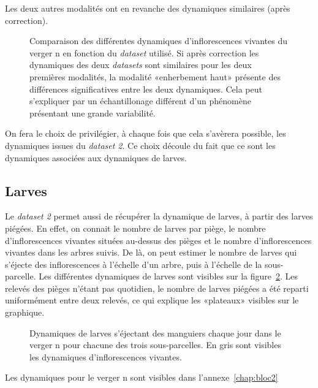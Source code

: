 Les deux autres modalités ont en revanche des dynamiques similaires (après correction).
\begin{figure}[ht]
\centering
{}
\caption{Comparaison des différentes dynamiques d'inflorescences vivantes du verger n en fonction du \emph{dataset} utilisé. Si après correction les dynamiques des deux \emph{datasets} sont similaires pour les deux premières modalités, la modalité «enherbement haut» présente des différences significatives entre les deux dynamiques. Cela peut s'expliquer par un échantillonage différent d'un phénomène présentant une grande variabilité.}
\label{fig:inflos}
\end{figure}

On fera le choix de privilégier, à chaque fois que cela s'avèrera possible, les dynamiques issues du \emph{dataset 2}.
Ce choix découle du fait que ce sont les dynamiques associées aux dynamiques de larves.


\subsection{Larves}

Le \emph{dataset 2} permet aussi de récupérer la dynamique de larves, à partir des larves piégées.
En effet, on connait le nombre de larves par piège, le nombre d'inflorescences vivantes situées au-dessus des pièges et le nombre d'inflorescences vivantes dans les arbres suivis.
De là, on peut estimer le nombre de larves qui s'éjecte des inflorescences à l'échelle d'un arbre, puis à l'échelle de la sous-parcelle.
Les différentes dynamiques de larves sont visibles sur la figure~\ref{fig:larves}.
Les relevés des pièges n'étant pas quotidien, le nombre de larves piégées a été reparti uniformément entre deux relevés, ce qui explique les «plateaux» visibles sur le graphique.
\begin{figure}[ht]
\centering
{}
\caption{Dynamiques de larves s'éjectant des manguiers chaque jour dans le verger n pour chacune des trois sous-parcelles. En gris sont visibles les dynamiques d'inflorescences vivantes.}
\label{fig:larves}
\end{figure}

Les dynamiques pour le verger n sont visibles dans l'annexe~\ref{chap:bloc2}
